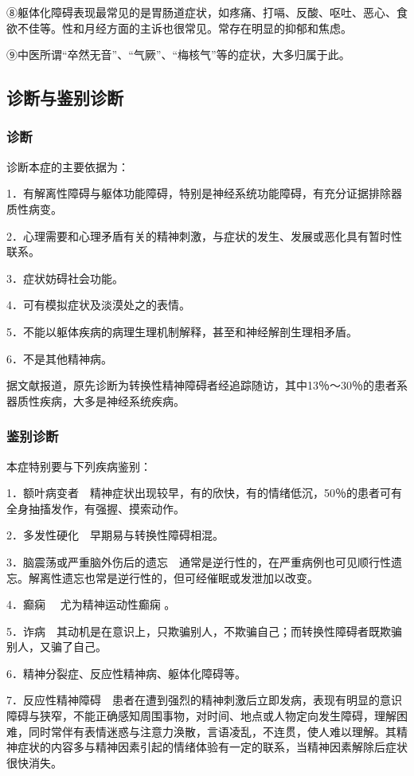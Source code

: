 ⑧躯体化障碍表现最常见的是胃肠道症状，如疼痛、打嗝、反酸、呕吐、恶心、食欲不佳等。性和月经方面的主诉也很常见。常存在明显的抑郁和焦虑。

⑨中医所谓“卒然无音”、“气厥”、“梅核气”等的症状，大多归属于此。

\subsection{诊断与鉴别诊断}

\subsubsection{诊断}

诊断本症的主要依据为：

1．有解离性障碍与躯体功能障碍，特别是神经系统功能障碍，有充分证据排除器质性病变。

2．心理需要和心理矛盾有关的精神刺激，与症状的发生、发展或恶化具有暂时性联系。

3．症状妨碍社会功能。

4．可有模拟症状及淡漠处之的表情。

5．不能以躯体疾病的病理生理机制解释，甚至和神经解剖生理相矛盾。

6．不是其他精神病。

据文献报道，原先诊断为转换性精神障碍者经追踪随访，其中13％～30％的患者系器质性疾病，大多是神经系统疾病。

\subsubsection{鉴别诊断}

本症特别要与下列疾病鉴别：

1．额叶病变者　精神症状出现较早，有的欣快，有的情绪低沉，50％的患者可有全身抽搐发作，有强握、摸索动作。

2．多发性硬化　早期易与转换性障碍相混。

3．脑震荡或严重脑外伤后的遗忘　通常是逆行性的，在严重病例也可见顺行性遗忘。解离性遗忘也常是逆行性的，但可经催眠或发泄加以改变。

4．癫痫
　尤为精神运动性癫痫 。

5．诈病　其动机是在意识上，只欺骗别人，不欺骗自己；而转换性障碍者既欺骗别人，又骗了自己。

6．精神分裂症、反应性精神病、躯体化障碍等。

7．反应性精神障碍　患者在遭到强烈的精神刺激后立即发病，表现有明显的意识障碍与狭窄，不能正确感知周围事物，对时间、地点或人物定向发生障碍，理解困难，同时常伴有表情迷惑与注意力涣散，言语凌乱，不连贯，使人难以理解。其精神症状的内容多与精神因素引起的情绪体验有一定的联系，当精神因素解除后症状很快消失。

